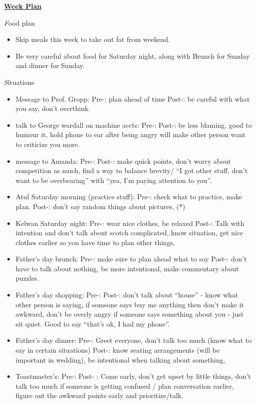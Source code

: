 \documentclass[serif,mathserif,final]{beamer}
\begin{document}
\begin{frame}{}
\begin{columns}[t]
\begin{column}{0.27\linewidth} {\textbf{\underline{Week Plan}}}
  \begin{block}{\textit Food plan } 
    \begin{itemize} 
      \small \item \small Skip meals this week to take out fat from weekend. 
    \item \small Be very careful about food for Saturday night, along with Brunch for Sunday and dinner for Sunday. 
    \end{itemize} 
  \end{block} 

  \begin{block}{\textit Situations} 
    \begin{itemize} 
    \item \tiny Message to Prof. Gropp: Pre-: plan ahead of time  Post-: be careful with what you say, don't overthink.
    \item \tiny talk to George wardall on machine accts: Pre-: Post-: be less blaming, good to humour it, hold phone to ear after being angry will make other person want to criticize you more. 
    \item \tiny message to Amanda:  Pre-:     Post-: make quick points, don't worry about competition as much, find a way to balance brevity/ ``I got other stuff, don't want to be overbearing'' with ``yea, I'm paying attention to you''. 
    \item \tiny Atul Saturday morning (practice stuff): Pre-: check what to practice, make plan. Post-: don't say random things about pictures, (*) 
    \item \tiny Kelwan Saturday night: Pre-: wear nice clothes, be relaxed Post-: Talk with intention and don't talk about scotch complicated, know situation, get nice clothes earlier so you have time to plan other things, 
    \item \tiny Father's day brunch: Pre-: make sure to plan ahead what to say Post-: don't have to talk about nothing, be more intentional, make commentary about puzzles. 
\item \tiny Father's day shopping: Pre-:  Post-: don't talk about ``house'' - know what other person is saying, if someone says buy me anything then don't make it awkward, don't be overly angry if someone says something about you - just sit quiet. Good to say ``that's ok, I had my phone''.  
    \item \tiny Father's day dinner: Pre-: Greet everyone, don't talk too much (know what to say in certain situations)  Post-: know seating arrangements (will be important in wedding), be intentional when talking about something, 
    \item \tiny Toastmaster's: Pre-:  Post- : Come early, don't get upset by little things, don't talk too much if someone is getting confused / plan conversation earlier, figure out the awkward points early and prioritize/talk. 
    \end{itemize} 
  \end{block} 


\end{column}
\end{columns}
\end{frame}
\end{document}
